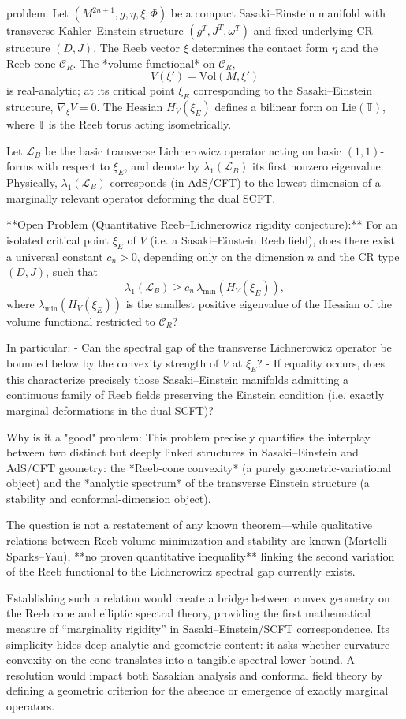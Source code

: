 problem:  
Let $(M^{2n+1}, g, \eta, \xi, \Phi)$ be a compact Sasaki–Einstein manifold with transverse Kähler–Einstein structure $(g^T, J^T, \omega^T)$ and fixed underlying CR structure $(D,J)$.  The Reeb vector $\xi$ determines the contact form $\eta$ and the Reeb cone $\mathcal{C}_R$.  The *volume functional* on $\mathcal{C}_R$,
\[
V(\xi') = \mathrm{Vol}(M, \xi')
\]
is real-analytic; at its critical point $\xi_E$ corresponding to the Sasaki–Einstein structure, $\nabla_\xi V = 0$.  The Hessian $H_V(\xi_E)$ defines a bilinear form on $\mathrm{Lie}(\mathbb{T})$, where $\mathbb{T}$ is the Reeb torus acting isometrically.

Let $\mathcal{L}_B$ be the basic transverse Lichnerowicz operator acting on basic $(1,1)$-forms with respect to $\xi_E$, and denote by $\lambda_1(\mathcal{L}_B)$ its first nonzero eigenvalue.  Physically, $\lambda_1(\mathcal{L}_B)$ corresponds (in AdS/CFT) to the lowest dimension of a marginally relevant operator deforming the dual SCFT.

**Open Problem (Quantitative Reeb–Lichnerowicz rigidity conjecture):**  
For an isolated critical point $\xi_E$ of $V$ (i.e. a Sasaki–Einstein Reeb field), does there exist a universal constant $c_n > 0$, depending only on the dimension $n$ and the CR type $(D,J)$, such that
\[
\lambda_1(\mathcal{L}_B) \ge c_n \, \lambda_{\min}(H_V(\xi_E)),
\]
where $\lambda_{\min}(H_V(\xi_E))$ is the smallest positive eigenvalue of the Hessian of the volume functional restricted to $\mathcal{C}_R$?  

In particular:
- Can the spectral gap of the transverse Lichnerowicz operator be bounded below by the convexity strength of $V$ at $\xi_E$?  
- If equality occurs, does this characterize precisely those Sasaki–Einstein manifolds admitting a continuous family of Reeb fields preserving the Einstein condition (i.e. exactly marginal deformations in the dual SCFT)?

Why is it a "good" problem:  
This problem precisely quantifies the interplay between two distinct but deeply linked structures in Sasaki–Einstein and AdS/CFT geometry: the *Reeb-cone convexity* (a purely geometric-variational object) and the *analytic spectrum* of the transverse Einstein structure (a stability and conformal-dimension object).  

The question is not a restatement of any known theorem—while qualitative relations between Reeb-volume minimization and stability are known (Martelli–Sparks–Yau), **no proven quantitative inequality** linking the second variation of the Reeb functional to the Lichnerowicz spectral gap currently exists.  

Establishing such a relation would create a bridge between convex geometry on the Reeb cone and elliptic spectral theory, providing the first mathematical measure of “marginality rigidity” in Sasaki–Einstein/SCFT correspondence.  Its simplicity hides deep analytic and geometric content: it asks whether curvature convexity on the cone translates into a tangible spectral lower bound.  A resolution would impact both Sasakian analysis and conformal field theory by defining a geometric criterion for the absence or emergence of exactly marginal operators.